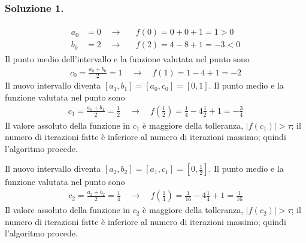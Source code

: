 \documentclass[letterpaper,10pt,italian]{jupyterBook}
\begin{document}
\subsubsection*{Soluzione 1.}

\sphinxAtStartPar
{}
\begin{equation*}
\begin{split}\begin{aligned}
  a_0 & = 0 \quad \rightarrow && f(0) = 0 + 0 + 1 =  1 > 0 \\
  b_0 & = 2 \quad \rightarrow && f(2) = 4 - 8 + 1 = -3 < 0
\end{aligned}\end{split}
\end{equation*}
\sphinxAtStartPar
{} Il punto medio dell’intervallo e la funzione valutata nel punto sono
\begin{equation*}
\begin{split}c_0 = \frac{a_0+b_0}{2} = 1 \quad \rightarrow \quad f(1) = 1 - 4 + 1 = -2\end{split}
\end{equation*}
\sphinxAtStartPar
{} Il nuovo intervallo diventa \([a_1, b_1] = [a_0, c_0] = [0, 1]\). Il punto medio e la funzione valutata nel punto sono
\begin{equation*}
\begin{split}c_1 = \frac{a_1 + b_1}{2} = \frac{1}{2} \quad \rightarrow \quad f\left(\frac{1}{2}\right) = \frac{1}{4} - 4 \frac{1}{2} + 1 = -\frac{3}{4} \end{split}
\end{equation*}
\sphinxAtStartPar
Il valore assoluto della funzione in \(c_1\) è maggiore della tolleranza, \(|f(c_1)| > \tau\); il numero di iterazioni fatte è inferiore al numero di iterazioni massimo; quindi l’algoritmo procede.

\sphinxAtStartPar
{} Il nuovo intervallo diventa \([a_2, b_2] = [a_1, c_1] = \left[0, \frac{1}{2}\right]\). Il punto medio e la funzione valutata nel punto sono
\begin{equation*}
\begin{split}c_2 = \frac{a_2 + b_2}{2} = \frac{1}{4} \quad \rightarrow \quad f\left(\frac{1}{4}\right) = \frac{1}{16} - 4 \frac{1}{4} + 1 = \frac{1}{16} \end{split}
\end{equation*}
\sphinxAtStartPar
Il valore assoluto della funzione in \(c_2\) è maggiore della tolleranza, \(|f(c_2)| > \tau\); il numero di iterazioni fatte è inferiore al numero di iterazioni massimo; quindi l’algoritmo procede.
\end{document}
